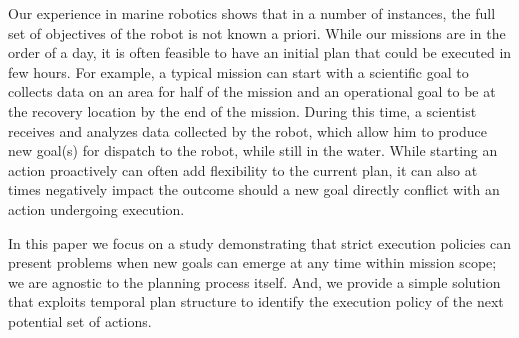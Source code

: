 Our experience in marine robotics shows that in a number of instances,
the full set of objectives of the robot is not known a priori. While
our missions are in the order of a day, it is often feasible to have
an initial plan that could be executed in few hours. For example, a
typical mission can start with a scientific goal to collects data on
an area for half of the mission and an operational goal to be at the
recovery location by the end of the mission. During this time, a
scientist receives and analyzes data collected by the robot, which
allow him to produce new goal(s) for dispatch to the robot, while
still in the water.  While starting an action proactively can often
add flexibility to the current plan, it can also at times negatively
impact the outcome should a new goal directly conflict with an action
undergoing execution.

In this paper we focus on a study demonstrating that strict execution
policies can present problems when new goals can emerge at any time
within mission scope; we are agnostic to the planning process
itself. And, we provide a simple solution that exploits temporal plan
structure to identify the execution policy of the next potential set
of actions. %






